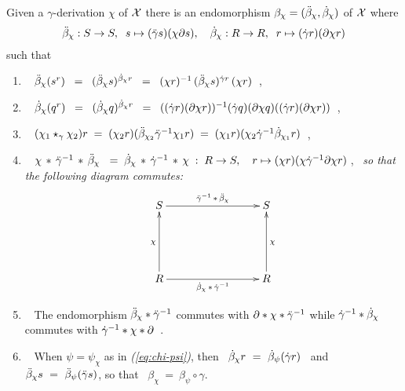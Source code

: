 \begin{lem} \label{lem:gamma-beta-chi}
Given a $\gamma$-derivation $\chi$ of $\mathcal{X}$ there is an endomorphism 
$\beta_{\chi} = (\ddot{\beta}_{\chi}, \dot{\beta}_{\chi})$
of $\mathcal{X}$ where
$$
\ddot{\beta}_{\chi} : S \to S, \;\; s \mapsto (\ddot{\gamma} s)(\chi \partial s), \quad
 \dot{\beta}_{\chi} : R \to R, \;\; r \mapsto  (\dot{\gamma} r)(\partial \chi r)
$$
such that 
\begin{enumerate}[{\rm (a)}]
\item~
$\ddot{\beta}_{\chi}(s^r) 
  \;\;=\;\;  (\ddot{\beta}_{\chi}s)^{\dot{\beta}_{\chi}r}
  \;\;=\;\;  (\chi r)^{-1}\,(\ddot{\beta}_{\chi} s)^{\dot{\gamma} r}\,(\chi r)$~,
\item~
$\dot{\beta}_{\chi}(q^r)
  \;\;=\;\;  (\dot{\beta}_{\chi}q)^{\dot{\beta}_{\chi}r}
  \;\;=\;\;  ((\dot{\gamma} r)(\partial\chi r))^{-1}(\dot{\gamma} q)(\partial\chi q)
                     ((\dot{\gamma} r)(\partial\chi r))$~, 
\item~ 
$(\chi_1\star_{\gamma}\chi_2) r 
\;=\;
(\chi_2 r)(\ddot{\beta}_{\chi_2} \ddot{\gamma}^{-1} \chi_1 r)
\;=\;
(\chi_1 r)(\chi_2 \dot{\gamma}^{-1} \dot{\beta}_{\chi_1} r)$~,
\item~
$\chi\,*\,{\ddg}^{-1}\,*\,\ddb_{\chi}\ 
 \;=\; \db_{\chi}\,*\,{\dg}^{-1}\,*\,\chi
 \;:\; R \to S, \quad r \mapsto (\chi r)(\chi\dg^{-1}\partial\chi r)$\,,~
\emph{so that the following diagram commutes:}
\begin{equation} \label{eq:gamma-sqchi}
\vcenter{\xymatrix{
   S \ar[rrr]^{{\ddg}^{-1}\,*\,\ddb_{\chi}}
     &&& S \\
     &&&  \\
   R \ar[uu]^{\chi} \ar[rrr]_{\db_{\chi}\,*\,{\dg}^{-1}} 
     &&& R \ar[uu]_{\chi}
}}
\end{equation}
\item~
The endomorphism  $\ddot{\beta}_{\chi} * \ddot{\gamma}^{-1}$  
commutes with  $\partial * \chi * \ddot{\gamma}^{-1}$  
while  $\dot{\gamma}^{-1} * \dot{\beta}_\chi$ commutes with  $\dot{\gamma}^{-1} * \chi * \partial$~. 
\item~
When $\psi = \psi_{\chi}$ as in \emph{(\ref{eq:chi-psi})}, 
then ~$\dot{\beta}_{\chi}r ~=~ \dot{\beta}_{\psi}(\dot{\gamma} r)$~ 
and ~$\ddot{\beta}_{\chi}s ~=~ \ddot{\beta}_{\psi}(\ddot{\gamma} s)$, 
so that ~$\beta_{\chi} ~=~ \beta_{\psi} \circ \gamma$. 
\end{enumerate}
\end{lem}
